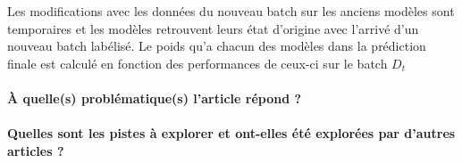 \documentclass[11pt,a4paper]{report}
\begin{document}
Les  modifications avec les données du nouveau batch sur les anciens modèles sont temporaires et les modèles retrouvent leurs état d'origine avec l'arrivé d'un nouveau batch labélisé. Le poids qu'a chacun des modèles dans la prédiction finale est calculé en fonction des performances de ceux-ci sur le batch $D_t$

\paragraph{À quelle(s) problématique(s) l'article répond ?} 

\paragraph{Quelles sont les pistes à explorer et ont-elles  été explorées par d'autres articles ?} 




\newpage
\end{document}
